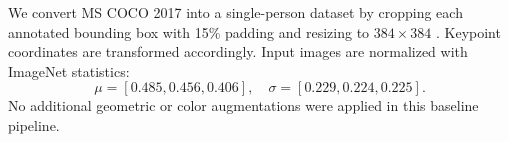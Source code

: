 We convert MS COCO 2017 into a single-person dataset by cropping each annotated bounding box with 15\% padding and resizing to $384\times384$ \cite{Dubey2023PoseSurvey}. Keypoint coordinates are transformed accordingly. Input images are normalized with ImageNet statistics:
\[
  \mu = [0.485, 0.456, 0.406],\quad
  \sigma = [0.229, 0.224, 0.225].
\]
No additional geometric or color augmentations were applied in this baseline pipeline.
